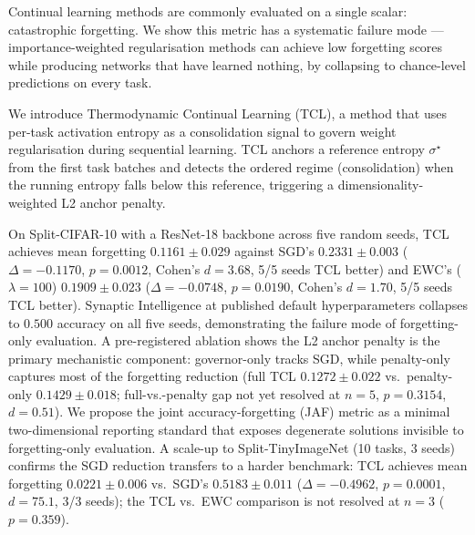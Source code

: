 Continual learning methods are commonly evaluated on a single scalar: catastrophic
forgetting. We show this metric has a systematic failure mode --- importance-weighted
regularisation methods can achieve low forgetting scores while producing networks that
have learned nothing, by collapsing to chance-level predictions on every task.

We introduce Thermodynamic Continual Learning (TCL), a method that uses per-task
activation entropy as a consolidation signal to govern weight regularisation during
sequential learning. TCL anchors a reference entropy $\sigma^\star$ from the first
task batches and detects the ordered regime (consolidation) when the running entropy
falls below this reference, triggering a dimensionality-weighted L2 anchor penalty.

On Split-CIFAR-10 with a ResNet-18 backbone across five random seeds, TCL achieves
mean forgetting $0.1161 \pm 0.029$ against SGD's $0.2331 \pm 0.003$
($\Delta = -0.1170$, $p = 0.0012$, Cohen's $d = 3.68$, 5/5 seeds TCL
better) and EWC's ($\lambda = 100$) $0.1909 \pm 0.023$
($\Delta = -0.0748$, $p = 0.0190$, Cohen's $d = 1.70$, 5/5 seeds TCL
better). Synaptic Intelligence at published default hyperparameters collapses to
$0.500$ accuracy on all five seeds, demonstrating the failure mode of
forgetting-only evaluation. A pre-registered ablation shows the L2 anchor penalty is
the primary mechanistic component: governor-only tracks SGD, while penalty-only
captures most of the forgetting reduction (full TCL $0.1272 \pm 0.022$
vs.~penalty-only $0.1429 \pm 0.018$; full-vs.-penalty gap not yet resolved at $n=5$,
$p = 0.3154$, $d = 0.51$). We propose the joint accuracy-forgetting (JAF) metric as
a minimal two-dimensional reporting standard that exposes degenerate solutions
invisible to forgetting-only evaluation. A scale-up to Split-TinyImageNet
(10 tasks, 3 seeds) confirms the SGD reduction transfers to a harder benchmark:
TCL achieves mean forgetting $0.0221 \pm 0.006$ vs.\ SGD's $0.5183 \pm 0.011$
($\Delta = -0.4962$, $p = 0.0001$, $d = 75.1$, 3/3 seeds); the TCL vs.\ EWC
comparison is not resolved at $n = 3$ ($p = 0.359$).